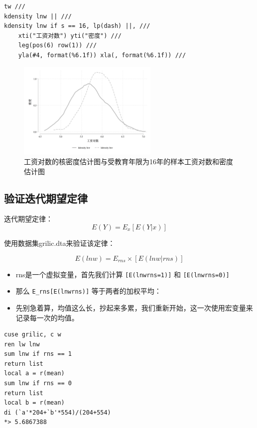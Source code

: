 \documentclass[]{ctexbook}
\providecommand{\tightlist}{%
  \setlength{\itemsep}{0pt}\setlength{\parskip}{0pt}}
\begin{document}
\begin{lstlisting}
tw ///
kdensity lnw || ///
kdensity lnw if s == 16, lp(dash) ||, ///
    xti("工资对数") yti("密度") ///
    leg(pos(6) row(1)) ///
    yla(#4, format(%6.1f)) xla(, format(%6.1f)) ///
\end{lstlisting}

\begin{figure}

{\centering \includegraphics[width=0.6\textwidth]{assets/kdensity2} 

}

\caption{工资对数的核密度估计图与受教育年限为16年的样本工资对数和密度估计图}\label{fig:kden2}
\end{figure}

\hypertarget{section-19}{%
\subsection{验证迭代期望定律}\label{section-19}}

迭代期望定律：
\[E(Y) = E_x[E(Y|x)]\]

使用数据集grilic.dta来验证该定律：

\[E(lnw) = E_{rns} \times [E(lnw|rns)]\]

\begin{itemize}
\tightlist
\item
  rns是一个虚拟变量，首先我们计算 \texttt{{[}E(lnw\textbar{}rns=1){]}} 和 \texttt{{[}E(lnw\textbar{}rns=0){]}}
\item
  那么 \texttt{E\_rns{[}E(lnw\textbar{}rns){]}} 等于两者的加权平均：
\item
  先别急着算，均值这么长，抄起来多累，我们重新开始，这一次使用宏变量来记录每一次的均值。
\end{itemize}

\begin{lstlisting}
cuse grilic, c w
ren lw lnw
sum lnw if rns == 1
return list
local a = r(mean)
sum lnw if rns == 0
return list
local b = r(mean)
di (`a'*204+`b'*554)/(204+554)
*> 5.6867388
\end{lstlisting}
\end{document}
